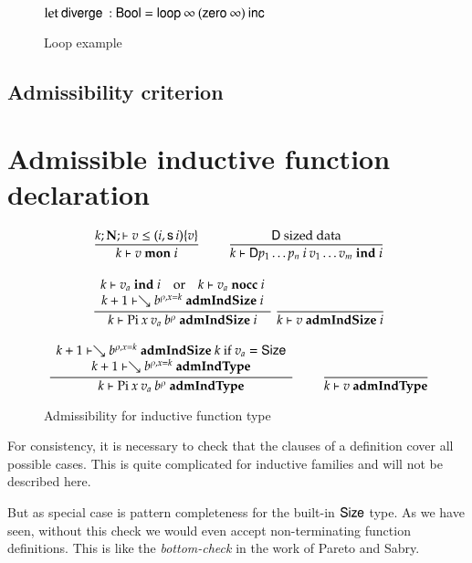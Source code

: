\begin{figure}
$\mathrm{let}\: \mathsf{diverge}\: : \mathsf{Bool} = \mathsf{loop}\: \infty\: (\mathsf{zero}\: \infty) \: \mathsf{inc}\:$\\
\caption{Loop example}
\label{loop}
\end{figure}

\subsection{Admissibility criterion}

\newcommand{\mon}[3]{#1\vdash#2\mbox{ \textbf{mon} }#3}
\newcommand{\indu}[3]{#1\vdash#2\mbox{ \textbf{ind} }#3}
\newcommand{\coind}[3]{#1\vdash#2\mbox{ \textbf{coind} }#3}
\newcommand{\admIndSize}[3]{#1\vdash#2\mbox{ \textbf{admIndSize} }#3}
\newcommand{\admCoSize}[3]{#1\vdash#2\mbox{ \textbf{admCoSize} }#3}
\newcommand{\admIndType}[2]{#1\vdash#2\mbox{ \textbf{admIndType}}}
\newcommand{\admCoType}[2]{#1\vdash#2\mbox{ \textbf{admCoType}}}

\newcommand{\sizePat}[1] {\vdash  #1\mbox{ \textbf{sizePat}}}
\newcommand{\sizePats}[1]{\vdash #1\mbox{ \textbf{sizePats}}}

\section{Admissible inductive function declaration}

\begin{figure}
\begin{gather*}
\nru{}
{\LeqVal{k}{\nF}{v}{\subst{(i,\s i)}{v}}}
{\mon{k}{v}{i}}
\qquad
\nru{}
{\DD \mbox{ sized data}}
{\indu{k}{\DD p_1 \ldots p_n \: i \: v_1 \ldots v_m}{i}}
\\[2ex]
\ndru{}
{\indu{k}{v_a}{i} \quad \mbox{or} \quad \nocc{k}{v_a}{i}}
{\admIndSize{k+1}{\wh \cl{b}{\ins{\rho}{x}{k}}}{i}}
{\admIndSize{k}{\vpi \: x \: v_a \: \cl{b}{\rho}}{i}}
\nru{}
{}
{\admIndSize{k}{v}{i}}
\\[2ex]
\ndru{}
{\admIndSize{k+1}{\wh \cl{b}{\ins{\rho}{x}{k}}}{k} \mbox{ if } v_a = \Size}
{\admIndType{k+1}{\wh \cl{b}{\ins{\rho}{x}{k}}}}
{\admIndType{k}{\vpi \: x \: v_a \: \cl{b}{\rho}}}
\qquad
\nru{}
{}
{\admIndType{k}{v}}
\end{gather*}
\caption{Admissibility for inductive function type}
\end{figure}

For consistency, it is necessary to check that the clauses of a definition cover all possible cases.
This is quite complicated for inductive families and will not be described here.

But as special case is pattern completeness for the built-in $\mathsf{Size}$ type.
As we have seen, without this check we would even accept non-terminating function definitions.
This is like the \emph{bottom-check} in the work of Pareto and Sabry.

